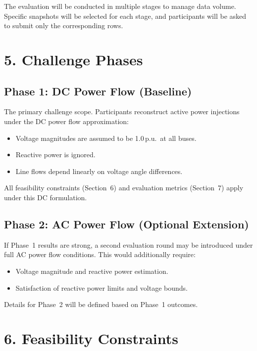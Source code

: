 \documentclass[11pt,a4paper]{article}
\begin{document}
The evaluation will be conducted in multiple stages to manage data volume. Specific snapshots will be selected for each stage, and participants will be asked to submit only the corresponding rows.

\section{5. Challenge Phases}

\subsection{Phase 1: DC Power Flow (Baseline)}

The primary challenge scope. Participants reconstruct active power injections under the DC power flow approximation:

\begin{itemize}[nosep]
  \item Voltage magnitudes are assumed to be 1.0\,p.u.\ at all buses.
  \item Reactive power is ignored.
  \item Line flows depend linearly on voltage angle differences.
\end{itemize}

All feasibility constraints (Section~6) and evaluation metrics (Section~7) apply under this DC formulation.

\subsection{Phase 2: AC Power Flow (Optional Extension)}

If Phase~1 results are strong, a second evaluation round may be introduced under full AC power flow conditions. This would additionally require:

\begin{itemize}[nosep]
  \item Voltage magnitude and reactive power estimation.
  \item Satisfaction of reactive power limits and voltage bounds.
\end{itemize}

Details for Phase~2 will be defined based on Phase~1 outcomes.

\section{6. Feasibility Constraints}
\end{document}

